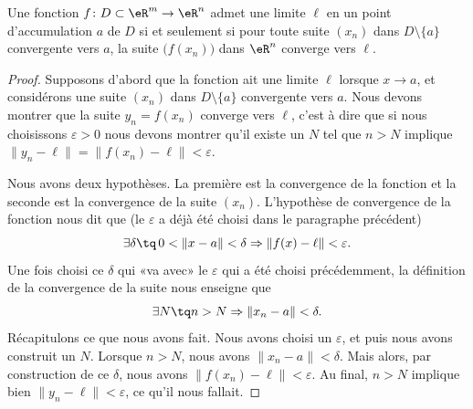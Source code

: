 \begin{theorem}		\label{ThoLimSuite}
	Une fonction $f\colon D\subset\eR^m\to \eR^n$ admet une limite $\ell$ en un point d'accumulation $a$ de $D$ si et seulement si pour toute suite $(x_n)$ dans $D\setminus\{ a \}$ convergente vers $a$, la suite $\big( f(x_n) \big)$ dans $\eR^n$ converge vers $\ell$.
\end{theorem}

\begin{proof}
	Supposons d'abord que la fonction ait une limite $\ell$ lorsque $x\to a$, et considérons une suite $(x_n)$ dans $D\setminus\{ a \}$ convergente vers $a$. Nous devons montrer que la suite $y_n=f(x_n)$ converge vers $\ell$, c'est à dire que si nous choisissons $\varepsilon>0$ nous devons montrer qu'il existe un $N$ tel que $n>N$ implique $\| y_n-\ell  \|=\| f(x_n)-\ell \|<\varepsilon$.

	Nous avons deux hypothèses. La première est la convergence de la fonction et la seconde est la convergence de la suite $(x_n)$. L'hypothèse de convergence de la fonction nous dit que (le $\varepsilon$ a déjà été choisi dans le paragraphe précédent)
	\begin{equation}
		\exists\delta\tq\,0<\| x-a \|<\delta\Rightarrow\| f(x)-\ell \|<\varepsilon.
	\end{equation}
	Une fois choisi ce $\delta$ qui «va avec» le $\varepsilon$ qui a été choisi précédemment, la définition de la convergence de la suite nous enseigne que
	\begin{equation}
		\exists N\tq n>N\Rightarrow\| x_n-a \|<\delta.
	\end{equation}
	Récapitulons ce que nous avons fait. Nous avons choisi un $\varepsilon$, et puis nous avons construit un $N$. Lorsque $n>N$, nous avons $\| x_n-a \|<\delta$. Mais alors, par construction de ce $\delta$, nous avons $\| f(x_n)-\ell \|<\varepsilon$. Au final, $n>N$ implique bien $\| y_n-\ell \|<\varepsilon$, ce qu'il nous fallait.


\end{proof}
